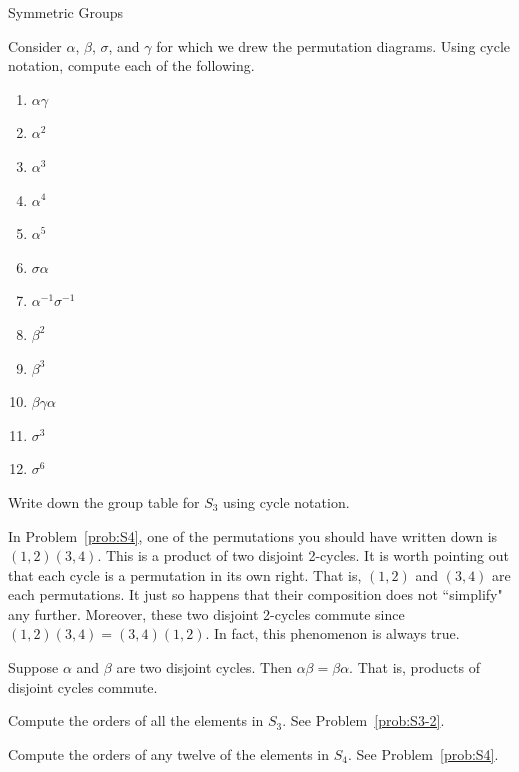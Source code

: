 \begin{section}{Symmetric Groups}
\begin{problem}
Consider $\alpha$, $\beta$, $\sigma$, and $\gamma$ for which we drew the permutation diagrams.  Using cycle notation, compute each of the following.
\begin{multicols}{2}
\begin{enumerate}[label=\textrm{(\alph*)}]
\item $\alpha\gamma$
\item $\alpha^2$
\item $\alpha^3$
\item $\alpha^4$
\item $\alpha^5$
\item $\sigma\alpha$
\item $\alpha^{-1}\sigma^{-1}$
\item $\beta^2$
\item $\beta^3$
\item $\beta\gamma\alpha$
\item $\sigma^3$
\item $\sigma^6$
\end{enumerate}
\end{multicols}
\end{problem}

\begin{problem}
Write down the group table for $S_3$ using cycle notation.
\end{problem}

In Problem~\ref{prob:S4}, one of the permutations you should have written down is $(1,2)(3,4)$.  This is a product of two disjoint 2-cycles.  It is worth pointing out that each cycle is a permutation in its own right.  That is, $(1,2)$ and $(3,4)$ are each permutations.  It just so happens that their composition does not ``simplify" any further.  Moreover, these two disjoint 2-cycles commute since $(1,2)(3,4)=(3,4)(1,2)$.  In fact, this phenomenon is always true.

\begin{theorem}
Suppose $\alpha$ and $\beta$ are two disjoint cycles.  Then $\alpha\beta=\beta\alpha$.  That is, products of disjoint cycles commute.
\end{theorem}

\begin{problem}
Compute the orders of all the elements in $S_3$.  See Problem~\ref{prob:S3-2}.
\end{problem}

\begin{problem}
Compute the orders of any twelve of the elements in $S_4$.  See Problem~\ref{prob:S4}.
\end{problem}


\end{section}
